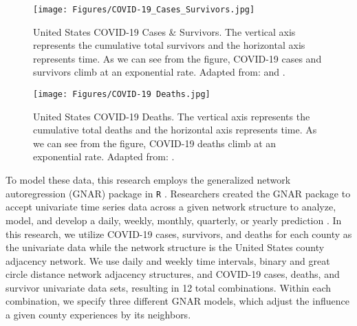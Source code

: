 \vspace{10mm}

\begin{figure} %
\centering
\texttt{[image: Figures/COVID-19\_Cases\_Survivors.jpg]}
\caption[United States COVID-19 Cases and Survivors]{United States COVID-19 Cases \& Survivors.  The vertical axis represents the cumulative total survivors and the horizontal axis represents time.  As we can see from the figure, {COVID-19} cases and survivors climb at an exponential rate. Adapted from: \cite{COVID19casesUSAFacts} and \cite{COVID19deathsUSAFacts}.}
\label{fig:covid-19 cases_survivors} %
\end{figure}

\begin{figure} %
\centering
\texttt{[image: Figures/COVID-19 Deaths.jpg]}
\caption[United States COVID-19 Deaths]{United States COVID-19 Deaths.  The vertical axis represents the cumulative total deaths and the horizontal axis represents time.  As we can see from the figure, {COVID-19} deaths climb at an exponential rate. Adapted from: \cite{COVID19deathsUSAFacts}.}
\label{fig:covid-19 deaths} %
\end{figure}

To model these data, this research employs the generalized network autoregression (GNAR) package in \texttt{R} \cite{GNARCRAN}.  Researchers created the {GNAR} package to accept univariate time series data across a given network structure to analyze, model, and develop a daily, weekly, monthly, quarterly, or yearly prediction \cite{GNARCRAN}.  In this research, we utilize COVID-19 cases, survivors, and deaths for each county as the univariate data while the network structure is the United States county adjacency network.  We use daily and weekly time intervals, binary and great circle distance network adjacency structures, and COVID-19 cases, deaths, and survivor univariate data sets, resulting in 12 total combinations.  Within each combination, we specify three different GNAR models, which adjust the influence a given county experiences by its neighbors.

